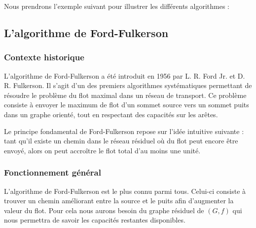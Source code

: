 \documentclass[a4paper]{article}
\begin{document}
Nous prendrons l'exemple suivant pour illustrer les différents algorithmes :
\begin{center}
\end{center}
\subsection{L'algorithme de Ford-Fulkerson}

\subsubsection{Contexte historique}

L’algorithme de Ford-Fulkerson a été introduit en 1956 par L. R. Ford Jr. et D. R. Fulkerson. Il s’agit d’un des premiers algorithmes systématiques permettant de résoudre le problème du flot maximal dans un réseau de transport. Ce problème consiste à envoyer le maximum de \og{}flot\fg{} d’un sommet source vers un sommet puits dans un graphe orienté, tout en respectant des capacités sur les arêtes\cite{Ford_Fulkerson_1956}.

Le principe fondamental de Ford-Fulkerson repose sur l’idée intuitive suivante : tant qu’il existe un chemin dans le réseau résiduel où du flot peut encore être envoyé, alors on peut accroître le flot total d'au moins une unité.
\subsubsection{Fonctionnement général}
L'algorithme de Ford-Fulkerson est le plus connu parmi tous. Celui-ci consiste à trouver un chemin améliorant entre la source et le puits afin d'augmenter la valeur du flot. Pour cela nous aurons besoin du graphe résiduel de $(G, f)$ qui nous permettra de savoir les capacités restantes disponibles.
\end{document}
